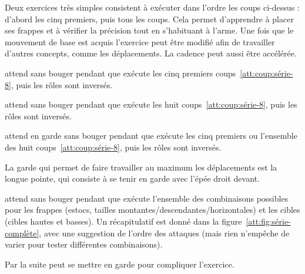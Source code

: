 Deux exercices très simples consistent à exécuter dans l'ordre les coups ci-dessus : d'abord les cinq premiers, puis tous les coups.
Cela permet d'apprendre à placer ses frappes et à vérifier la précision tout en s'habituant à l'arme.
Une fois que le mouvement de base est acquis l'exercice peut être modifié afin de travailler d'autres concepts, comme les déplacements.
La cadence peut aussi être accélérée.


\begin{exercice}


\D attend sans bouger pendant que \A exécute les cinq premiers coups~\ref{att:coup:série-8}, puis les rôles sont inversés.

\end{exercice}


\begin{exercice}


\D attend sans bouger pendant que \A exécute les huit coups~\ref{att:coup:série-8}, puis les rôles sont inversés.

\end{exercice}


\begin{exercice}


\D attend en garde sans bouger pendant que \A exécute les cinq premiers ou l'ensemble des huit coups~\ref{att:coup:série-8}, puis les rôles sont inversés.

La garde qui permet de faire travailler au maximum les déplacements est la longue pointe, qui consiste à se tenir en garde avec l'épée droit devant.

\end{exercice}


\begin{exercice}


\D attend sans bouger pendant que \A exécute l'ensemble des combinaisons possibles pour les frappes (estocs, tailles montantes/descendantes/horizontales) et les cibles (cibles hautes et basses).
Un récapitulatif est donné dans la figure~\ref{att:fig:série-complète}, avec une suggestion de l'ordre des attaques (mais rien n'empêche de varier pour tester différentes combinaisons).

Par la suite \D peut se mettre en garde pour compliquer l'exercice.
\end{exercice}


